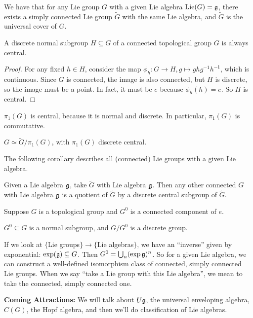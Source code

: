  We have that for any Lie group $G$ with a given Lie algebra $\operatorname{Lie}(G)=\mathfrak{g}$,
 there exists a simply connected Lie group $\tilde G$ with the same Lie algebra, and
 $\tilde G$ is the universal cover of $G$.

 \begin{lemma}\label{lec05L:discCentral}
   A discrete normal subgroup $H\subseteq G$ of a connected topological group $G$ is
   always central.
 \end{lemma}
 \begin{proof}
   For any fixed $h\in H$, consider the map $\phi_h:G\to H, g\mapsto ghg^{-1}h^{-1}$,
   which is continuous. Since $G$ is connected, the image is also connected, but $H$
   is discrete, so the image must be a point. In fact, it must be $e$ because
   $\phi_h(h)=e$. So $H$ is central.
 \end{proof}

 \begin{corollary}
   $\pi_1(G)$ is central, because it is normal and discrete. In particular, $\pi_1(G)$
   is commutative.
 \end{corollary}

 \begin{corollary}
   $G\simeq \tilde G/\pi_1(G)$, with $\pi_1(G)$ discrete central.
 \end{corollary}
 The following corollary describes all (connected) Lie groups with a given Lie algebra.

 \begin{corollary}
  Given a Lie algebra $\mathfrak{g}$, take $\tilde
 G$ with Lie algebra $\mathfrak{g}$. Then any other connected $G$ with Lie algebra $\mathfrak{g}$ is a quotient of
 $\tilde G$ by a discrete central subgroup of $\tilde G$.
\end{corollary}

 Suppose $G$ is a topological group and $G^0$ is a connected component of $e$.
 \begin{claim}
   $G^0\subseteq G$ is a normal subgroup, and $G/G^0$ is a discrete group.
 \end{claim}
 If we look at $\{$Lie groups$\}\to \{$Lie algebras$\}$, we have an ``inverse'' given
 by exponential: $\exp(\mathfrak{g})\subseteq G$. Then $G^0=\bigcup_n (\exp \mathfrak{g})^n$. So for a
 given Lie algebra, we can construct a well-defined isomorphism class of connected,
 simply connected Lie groups. When we say ``take a Lie group with this Lie algebra'',
 we mean to take the connected, simply connected one.

\textbf{Coming Attractions:}
 We will talk about $U\mathfrak{g}$, the universal enveloping algebra, $C(G)$, the Hopf algebra,
 and then we'll do classification of Lie algebras.
